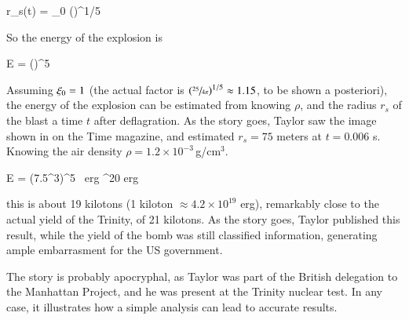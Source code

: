 \beq
r_s(t) = \ksi_0 \left(\right)^{1/5}
\eeq

So the energy of the explosion is 

\beq
E = \left(\right)^5 
\eeq

Assuming $\xi_0=1$ (the actual factor is $\left(\sfrac{25}{4\pi}\right)^{1/5}\approx
1.15$, to be shown a posteriori), the energy of the explosion can be 
estimated from knowing $\rho$, and the radius $r_s$ of the blast a time $t$
after deflagration. As the story goes, Taylor saw the image shown in
 on the Time magazine, and estimated $r_s=75$ meters at
$t=0.006$ s. Knowing the air density $\rho=1.2\times 10^{-3}$\,g/cm$^3$.

\beq
E = \left(7.5^3\right)^5 \ {\rm erg}
^{20} {\rm erg} 
\eeq

this is about 19 kilotons (1 kiloton $\approx 4.2\times 10^{19}$
erg), remarkably close to the actual yield of the Trinity, of 21
kilotons. As the story goes, Taylor published this result, while the
yield of the bomb was still classified information, generating ample embarrasment for the US
government. 

The story is probably apocryphal, as Taylor was part of the British
delegation to the Manhattan Project, and he was present at the Trinity
nuclear test. In any case, it illustrates how a simple analysis can
lead to accurate results. 







